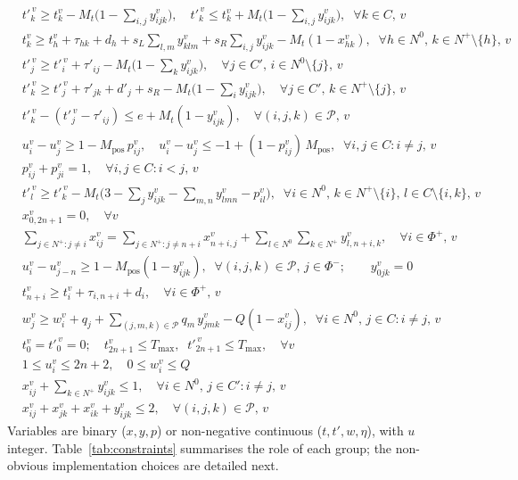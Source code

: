\documentclass[11pt,a4paper]{article}
\newcommand{\Nplus}{N^{+}}
\newcommand{\NO}{N^{0}}
\newcommand{\Cprime}{C'}
\begin{document}
{\begin{align}
& t'^{\,v}_{k}\ge t^{v}_{k}-M_t\big(1-\textstyle\sum_{i,j}y^{v}_{ijk}\big),\quad
  t'^{\,v}_{k}\le t^{v}_{k}+M_t\big(1-\textstyle\sum_{i,j}y^{v}_{ijk}\big),
   \;\; \forall k\in C,\,v \tag{14,15}\\
& t^{v}_{k}\ge t^{v}_{h}+\tau_{hk}+d_{h}
   +s_{L}\!\textstyle\sum_{l,m}y^{v}_{klm}
   +s_{R}\!\textstyle\sum_{i,j}y^{v}_{ijk}-M_t(1-x^{v}_{hk}),
   \;\; \forall h\in\NO,\,k\in\Nplus\!\setminus\!\{h\},\,v \tag{16}\\
& t'^{\,v}_{j}\ge t'^{\,v}_{i}+\tau'_{ij}-M_t\big(1-\textstyle\sum_{k}y^{v}_{ijk}\big),
   \quad \forall j\in\Cprime,\,i\in\NO\!\setminus\!\{j\},\,v \tag{17}\\
& t'^{\,v}_{k}\ge t'^{\,v}_{j}+\tau'_{jk}+d'_{j}+s_{R}
   -M_t\big(1-\textstyle\sum_{i}y^{v}_{ijk}\big),
   \quad \forall j\in\Cprime,\,k\in\Nplus\!\setminus\!\{j\},\,v \tag{18}\\
& t'^{\,v}_{k}-(t'^{\,v}_{j}-\tau'_{ij})\le e+M_t(1-y^{v}_{ijk}),
   \quad \forall (i,j,k)\in\mathcal P,\,v \tag{19}\\
& u^{v}_{i}-u^{v}_{j}\ge 1-M_{\mathrm{pos}}\,p^{v}_{ij},\quad
  u^{v}_{i}-u^{v}_{j}\le -1+(1-p^{v}_{ij})\,M_{\mathrm{pos}},
   \;\; \forall i,j\in C:i\ne j,\,v \tag{20,21}\\
& p^{v}_{ij}+p^{v}_{ji}=1,\quad \forall i,j\in C:i<j,\,v \tag{22}\\
& t'^{\,v}_{l}\ge t'^{\,v}_{k}-M_t\big(3-\textstyle\sum_{j}y^{v}_{ijk}
   -\sum_{m,n}y^{v}_{lmn}-p^{v}_{il}\big),
   \;\; \forall i\in\NO,\,k\in\Nplus\!\setminus\!\{i\},\,l\in C\!\setminus\!\{i,k\},\,v \tag{23}\\
& x^{v}_{0,2n+1}=0,\quad \forall v \tag{24}\\
& \sum_{j\in\Nplus:j\ne i}x^{v}_{ij}=\sum_{j\in\Nplus:j\ne n+i}x^{v}_{n+i,j}
   +\sum_{l\in\NO}\sum_{k\in\Nplus}y^{v}_{l,n+i,k},
   \quad \forall i\in\Phi^{+},\,v \tag{25}\\
& u^{v}_{i}-u^{v}_{j-n}\ge 1-M_{\mathrm{pos}}(1-y^{v}_{ijk}),
   \;\; \forall (i,j,k)\in\mathcal P,\,j\in\Phi^{-};\qquad y^{v}_{0jk}=0 \tag{26}\\
& t^{v}_{n+i}\ge t^{v}_{i}+\tau_{i,n+i}+d_{i},
   \quad \forall i\in\Phi^{+},\,v \tag{27}\\
& w^{v}_{j}\ge w^{v}_{i}+q_{j}
   +\!\!\sum_{(j,m,k)\in\mathcal P}\!\! q_{m}\,y^{v}_{jmk}-Q(1-x^{v}_{ij}),
   \;\; \forall i\in\NO,\,j\in C:i\ne j,\,v \tag{28}\\
& t^{v}_{0}=t'^{\,v}_{0}=0;\quad
  t^{v}_{2n+1}\le T_{\max},\;\; t'^{\,v}_{2n+1}\le T_{\max},
   \quad \forall v \tag{31--34}\\
& 1\le u^{v}_{i}\le 2n{+}2,\quad 0\le w^{v}_{i}\le Q \tag{36,37}\\
& x^{v}_{ij}+\textstyle\sum_{k\in\Nplus}y^{v}_{ijk}\le 1,
   \quad \forall i\in\NO,\,j\in\Cprime:i\ne j,\,v \tag{43}\\
& x^{v}_{ij}+x^{v}_{jk}+x^{v}_{ik}+y^{v}_{ijk}\le 2,
   \quad \forall (i,j,k)\in\mathcal P,\,v \tag{44}
\end{align}}%
Variables are binary ($x,y,p$) or non-negative continuous ($t,t',w,\eta$),
with $u$ integer. Table~\ref{tab:constraints} summarises the role of each
group; the non-obvious implementation choices are detailed next.
\end{document}
